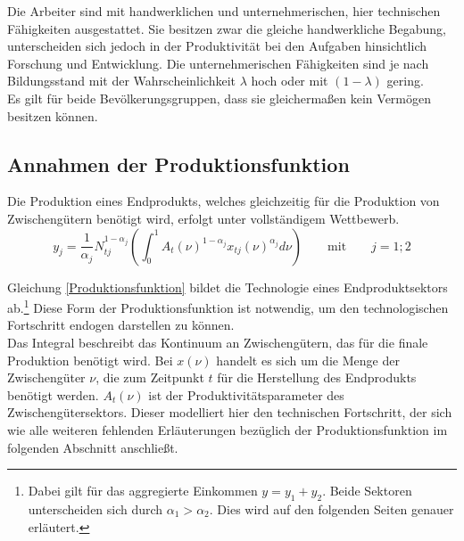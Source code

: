 %
Die Arbeiter sind mit handwerklichen und unternehmerischen, hier technischen Fähigkeiten ausgestattet. Sie besitzen zwar die gleiche handwerkliche Begabung, unterscheiden sich jedoch in der Produktivität bei den Aufgaben hinsichtlich Forschung und Entwicklung. Die unternehmerischen Fähigkeiten sind je nach Bildungsstand mit der Wahrscheinlichkeit $\lambda$ hoch oder mit $(1-\lambda)$ gering.\\
%
Es gilt für beide Bevölkerungsgruppen, dass sie gleichermaßen kein Vermögen besitzen können.
%
\subsection{Annahmen der Produktionsfunktion}\label{sec:Annahmen der Produktionsfunktion}
Die Produktion eines Endprodukts, welches gleichzeitig für die Produktion von Zwischengütern benötigt wird, erfolgt unter vollständigem Wettbewerb. 
\begin{equation}
y_j=\frac{1}{\alpha_j}N_{tj}^{1-\alpha_j}\left(\int_0^1{A_t(\nu)^{1-\alpha_j}x_{tj}(\nu)^{\alpha_j}}d\nu\right)\label{Produktionsfunktion} \qquad \text{mit} \qquad  j= 1;2
\end{equation}
 
Gleichung \eqref{Produktionsfunktion} bildet die Technologie eines Endproduktsektors ab.\footnote{Dabei gilt für das aggregierte Einkommen $y=y_1+y_{2}$. Beide Sektoren unterscheiden sich durch $\alpha_1>\alpha_{2}$. Dies wird auf den folgenden Seiten genauer erläutert.} Diese Form der Produktionsfunktion ist notwendig, um den technologischen Fortschritt endogen darstellen zu können.\\
%
Das Integral beschreibt das Kontinuum an Zwischengütern, das für die finale Produktion benötigt wird. Bei $x(\nu)$ handelt es sich um die Menge der Zwischengüter $\nu$, die zum Zeitpunkt $t$ für die Herstellung des Endprodukts benötigt werden. $A_t(\nu)$ ist der Produktivitätsparameter des Zwischengütersektors. Dieser modelliert hier den technischen Fortschritt, der sich wie alle weiteren fehlenden Erläuterungen bezüglich der Produktionsfunktion im folgenden Abschnitt anschließt.
%

